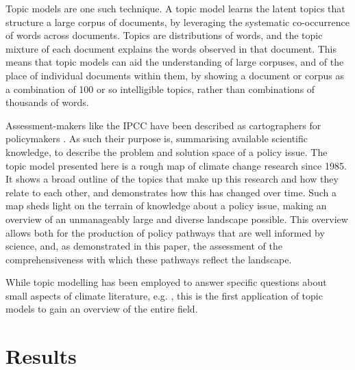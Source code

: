 \documentclass{article}
\begin{document}
Topic models are one such technique. A topic model learns the latent topics that structure a large corpus of documents, by leveraging the systematic co-occurrence of words across documents. Topics are distributions of words, and the topic mixture of each document explains the words observed in that document. This means that topic models can aid the understanding of large corpuses, and of the place of individual documents within them, by showing a document or corpus as a combination of 100 or so intelligible topics, rather than combinations of thousands of words.

Assessment-makers like the IPCC have been described as cartographers for policymakers \citep{Edenhofer2015}. As such their purpose is, summarising available scientific knowledge, to describe the problem and solution space of a policy issue. The topic model presented here is a rough map of climate change research since 1985. It shows a broad outline of the topics that make up this research and how they relate to each other, and demonstrates how this has changed over time. Such a map sheds light on the terrain of knowledge about a policy issue, making an overview of an unmanageably large and diverse landscape possible. This overview allows both for the production of policy pathways that are well informed by science, and, as demonstrated in this paper, the assessment of the comprehensiveness with which these pathways reflect the landscape.




While topic modelling has been employed to answer specific questions about small aspects of climate literature, e.g. \citep[e.g.][]{Minx2017FastEmissions, Grubert2016}, this is the first application of topic models to gain an overview of the entire field.









\section*{Results}
\end{document}
